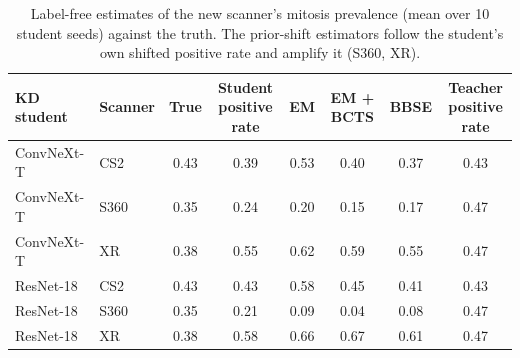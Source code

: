 \begin{table}[htbp]
{\caption{Label-free estimates of the new scanner's mitosis prevalence (mean over 10 student seeds) against the truth. The prior-shift estimators follow the student's own shifted positive rate and amplify it (S360, XR).}}
{%
\scriptsize
\setlength{\tabcolsep}{3pt}
\begin{tabular}{@{}llcccccc@{}}
\toprule
KD student & Scanner & True & \makecell{Student positive\\rate} & EM & EM + BCTS & BBSE & \makecell{Teacher positive\\rate} \\
\midrule
ConvNeXt-T & CS2 & 0.43 & 0.39 & 0.53 & 0.40 & 0.37 & 0.43 \\
ConvNeXt-T & S360 & 0.35 & 0.24 & 0.20 & 0.15 & 0.17 & 0.47 \\
ConvNeXt-T & XR & 0.38 & 0.55 & 0.62 & 0.59 & 0.55 & 0.47 \\
ResNet-18 & CS2 & 0.43 & 0.43 & 0.58 & 0.45 & 0.41 & 0.43 \\
ResNet-18 & S360 & 0.35 & 0.21 & 0.09 & 0.04 & 0.08 & 0.47 \\
ResNet-18 & XR & 0.38 & 0.58 & 0.66 & 0.67 & 0.61 & 0.47 \\
\bottomrule
\end{tabular}
}
\end{table}
